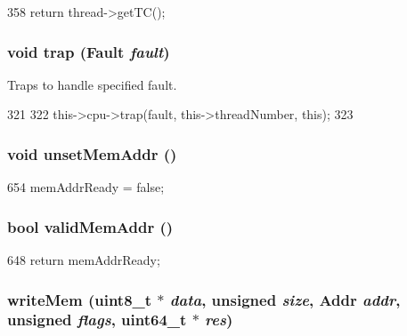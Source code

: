 \begin{DoxyCode}
358 { return thread->getTC(); }
\end{DoxyCode}
\hypertarget{classInOrderDynInst_ac74f75adb89c94e4387498067f5567ff}{
\subsubsection[{trap}]{\setlength{\rightskip}{0pt plus 5cm}void trap ({\bf Fault} {\em fault})}}
\label{classInOrderDynInst_ac74f75adb89c94e4387498067f5567ff}
Traps to handle specified fault. 


\begin{DoxyCode}
321 {
322     this->cpu->trap(fault, this->threadNumber, this);
323 }
\end{DoxyCode}
\hypertarget{classInOrderDynInst_a4f1222744b70f43999a2f9a0455eb44f}{
\subsubsection[{unsetMemAddr}]{\setlength{\rightskip}{0pt plus 5cm}void unsetMemAddr ()}}
\label{classInOrderDynInst_a4f1222744b70f43999a2f9a0455eb44f}



\begin{DoxyCode}
654     { memAddrReady = false;}
\end{DoxyCode}
\hypertarget{classInOrderDynInst_a3720de22b955e2c018eac091cd9247cc}{
\subsubsection[{validMemAddr}]{\setlength{\rightskip}{0pt plus 5cm}bool validMemAddr ()}}
\label{classInOrderDynInst_a3720de22b955e2c018eac091cd9247cc}



\begin{DoxyCode}
648     { return memAddrReady; }
\end{DoxyCode}
\hypertarget{classInOrderDynInst_ad46c5edeb1ee9b60445f3e26364e2c5e}{
\subsubsection[{writeMem}]{ writeMem (uint8\_\-t $\ast$ {\em data}, \/  unsigned {\em size}, \/  {\bf Addr} {\em addr}, \/  unsigned {\em flags}, \/  uint64\_\-t $\ast$ {\em res})}}
\label{classInOrderDynInst_ad46c5edeb1ee9b60445f3e26364e2c5e}



